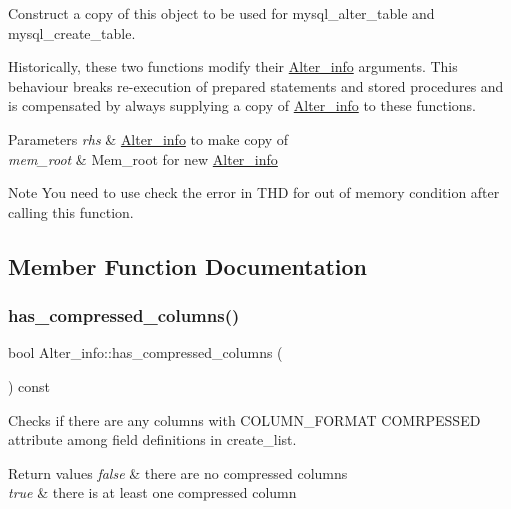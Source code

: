 Construct a copy of this object to be used for mysql\+\_\+alter\+\_\+table and mysql\+\_\+create\+\_\+table.

Historically, these two functions modify their \mbox{\hyperlink{classAlter__info}{Alter\+\_\+info}} arguments. This behaviour breaks re-\/execution of prepared statements and stored procedures and is compensated by always supplying a copy of \mbox{\hyperlink{classAlter__info}{Alter\+\_\+info}} to these functions.


\begin{DoxyParams}{Parameters}
{\em rhs} & \mbox{\hyperlink{classAlter__info}{Alter\+\_\+info}} to make copy of \\
\hline
{\em mem\+\_\+root} & Mem\+\_\+root for new \mbox{\hyperlink{classAlter__info}{Alter\+\_\+info}}\\
\hline
\end{DoxyParams}
\begin{DoxyNote}{Note}
You need to use check the error in T\+HD for out of memory condition after calling this function. 
\end{DoxyNote}


\subsection{Member Function Documentation}
\mbox{\label{classAlter__info_a9b969540dfb6e102317110171387b467}} 
\subsubsection{\texorpdfstring{has\+\_\+compressed\+\_\+columns()}{has\_compressed\_columns()}}
{\footnotesize\ttfamily bool Alter\+\_\+info\+::has\+\_\+compressed\+\_\+columns (\begin{DoxyParamCaption}{ }\end{DoxyParamCaption}) const}

Checks if there are any columns with C\+O\+L\+U\+M\+N\+\_\+\+F\+O\+R\+M\+AT C\+O\+M\+R\+P\+E\+S\+S\+ED attribute among field definitions in create\+\_\+list.


\begin{DoxyRetVals}{Return values}
{\em false} & there are no compressed columns \\
\hline
{\em true} & there is at least one compressed column \\
\hline
\end{DoxyRetVals}
\mbox{\label{classAlter__info_a5d721db444541bf1ef0e0ed218976d75}} 
